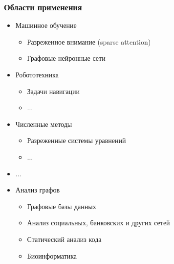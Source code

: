 \documentclass[xcolor=table,aspectratio=169]{beamer}
\begin{document}
\begin{frame}[fragile]
  \frametitle{Области применения}
  \begin{minipage}{0.46\textwidth}
    \begin{itemize}
    \item Машинное обучение
    \begin{itemize}
      \item Разреженное внимание (sparse attention)
      \item Графовые нейронные сети
    \end{itemize}
    \item Робототехника
    \begin{itemize}
      \item Задачи навигации
      \item $\ldots$
    \end{itemize}
    \item Численные методы
    \begin{itemize}
      \item Разреженные системы уравнений
      \item $\ldots$
    \end{itemize}
    \item $\ldots$
  \end{itemize}
  \end{minipage}
  \begin{minipage}{0.46\textwidth}
    \begin{itemize}
      \item Анализ графов
      \begin{itemize}
        \item Графовые базы данных
        \item Анализ социальных, банковских и других сетей
        \item Статический анализ кода
        \item Биоинформатика
      \end{itemize}
    \end{itemize}
  \end{minipage}
  
\end{frame}
\end{document}
